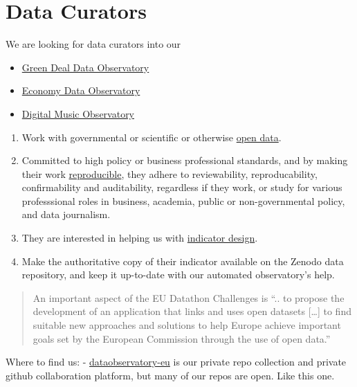 \documentclass[
  a4paper,
  openany, a4paper, oneside]{book}
\begin{document}
\hypertarget{data-curators}{%
\chapter{Data Curators}\label{data-curators}}

We are looking for data curators into our

\begin{itemize}
\item
  \href{https://greendeal.dataobservatory.eu/\#contributors}{Green Deal Data Observatory}
\item
  \href{https://economy.dataobservatory.eu/\#contributors}{Economy Data Observatory}
\item
  \href{https://music.dataobservatory.eu/\#contributors}{Digital Music Observatory}
\end{itemize}

\begin{enumerate}
\def\labelenumi{\arabic{enumi}.}
\item
  Work with governmental or scientific or otherwise \protect\hyperlink{open-data}{open data}.
\item
  Committed to high policy or business professional standards, and by making their work \protect\hyperlink{reproducible-research}{reproducible}, they adhere to reviewability, reproducability, confirmability and auditability, regardless if they work, or study for various professsional roles in business, academia, public or non-governmental policy, and data journalism.
\item
  They are interested in helping us with \protect\hyperlink{indicator-design}{indicator design}.
\item
  Make the authoritative copy of their indicator available on the Zenodo data repository, and keep it up-to-date with our automated observatory's help.
\end{enumerate}

\begin{quote}
An important aspect of the EU Datathon Challenges is ``.. to propose the development of an application that links and uses open datasets {[}\ldots{]} to find suitable new approaches and solutions to help Europe achieve important goals set by the European Commission through the use of open data.''
\end{quote}

Where to find us:
- \href{https://github.com/dataobservatory-eu}{dataobservatory-eu} is our private repo collection and private github collaboration platform, but many of our repos are open. Like this one.
\end{document}
